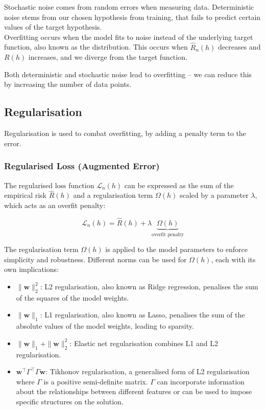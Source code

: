 Stochastic noise comes from random errors when measuring data. Deterministic noise stems from our chosen hypothesis from training, that fails to predict certain values of the target hypothesis.\\

Overfitting occurs when the model fits to noise instead of the underlying target function, also known as the distribution. This occurs when \(\widehat{R}_n(h)\) decreases and \(R(h)\) increases, and we diverge from the target function.

Both deterministic and stochastic noise lead to overfitting – we can reduce this by increasing the number of data points.

\subsection{Regularisation}

Regularisation is used to combat overfitting, by adding a penalty term to the error.

\subsubsection*{Regularised Loss (Augmented Error)}

The regularised loss function \(\mathcal{L}_n(h)\) can be expressed as the sum of the empirical risk \(\hat{R}(h)\) and a regularisation term \(\Omega(h)\) scaled by a parameter \(\lambda\), which acts as an overfit penalty:

\[
\mathcal{L}_n(h) = \hat{R}(h) + \lambda \underbrace{\Omega(h)}_{\text{overfit penalty}}
\]

The regularisation term \(\Omega(h)\) is applied to the model parameters to enforce simplicity and robustness. Different norms can be used for \(\Omega(h)\), each with its own implications:

\begin{itemize}
    \item \(\|\mathbf{w}\|_2^2\): L2 regularisation, also known as Ridge regression, penalises the sum of the squares of the model weights.
    \item \(\|\mathbf{w}\|_1\): L1 regularisation, also known as Lasso, penalises the sum of the absolute values of the model weights, leading to sparsity.
    \item \(\|\mathbf{w}\|_1 + \|\mathbf{w}\|_2^2\): Elastic net regularisation combines L1 and L2 regularisation.
    \item \(\mathbf{w}^\top \Gamma ^\top \Gamma \mathbf{w}\): Tikhonov regularisation, a generalised form of L2 regularisation where \(\Gamma\) is a positive semi-definite matrix. \(\Gamma\) can incorporate information about the relationships between different features or can be used to impose specific structures on the solution.
\end{itemize}

